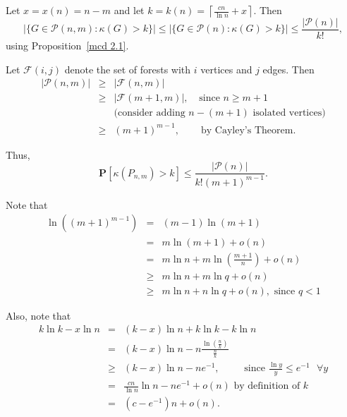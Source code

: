 \documentclass{article}
\newtheorem{Proof of Theorem}{Proof of Theorem}
\begin{document}
Let $x=x(n)=n-m$ and let $k=k(n)= \left \lceil \frac{cn}{\ln n} +x \right \rceil$.
Then
\begin{displaymath}
| \{ G \in \mathcal{P}(n,m):\kappa(G)>k \}| \leq | \{ G \in \mathcal{P}(n):\kappa(G)>k \}| \leq 
\frac{|\mathcal{P}(n)|}{k!},
\end{displaymath}
using Proposition~\ref{mcd 2.1}.

Let $\mathcal{F}(i,j)$ denote the set of forests with $i$ vertices and $j$ edges.
Then
\begin{eqnarray*}
|\mathcal{P}(n,m)| & \geq & |\mathcal{F}(n,m)| \\
& \geq & |\mathcal{F}(m+1,m)|, \phantom{w} \textrm{ since } n \geq m+1 \phantom{ww} \\
& & \textrm{(consider adding $n-(m+1)$ isolated vertices)} \\
& \geq & (m+1)^{m-1}, \phantom{www} \textrm{by Cayley's Theorem}. 
\end{eqnarray*}

Thus, 
\begin{displaymath}
\mathbf{P} [\kappa (P_{n,m}) > k] \leq \frac{|\mathcal{P}(n)|}{k!(m+1)^{m-1}}. 
\end{displaymath}


Note that 
\begin{eqnarray}
\ln \left( (m+1)^{m-1} \right) & = & (m-1) \ln (m+1) \nonumber \\
& = & m \ln (m+1) + o(n) \nonumber \\
& = & m \ln n + m \ln \left( \frac{m+1}{n} \right) + o(n) \nonumber \\
& \geq & m \ln n + m \ln q + o(n) \nonumber \\
& \geq & m \ln n + n \ln q + o(n), \textrm{ since } q<1\label{eq:c1} 
\end{eqnarray}

Also, note that
\begin{eqnarray} 
k \ln k - x \ln n & = & (k-x) \ln n + k \ln k - k \ln n \nonumber \\
& = & (k-x) \ln n - n \frac{ \ln \left( \frac{n}{k} \right) }{\frac{n}{k}} \nonumber \\
& \geq & (k-x) \ln n - ne^{-1}, \phantom{www}
\textrm{ since } \frac{\ln y}{y} \leq e^{-1} \textrm{ } \forall y \nonumber \\
& = & \frac{cn}{\ln n} \ln n - ne^{-1} + o(n) \textrm{ by definition of } k \nonumber \\
& = & \left(c- e^{-1} \right) n + o(n). \label{eq:c2} 
\nonumber 
\end{eqnarray}
\end{document}
